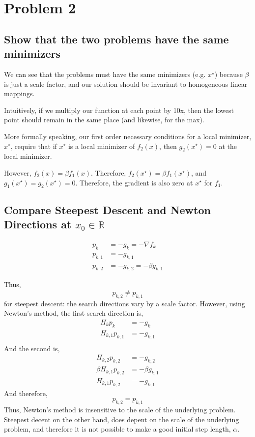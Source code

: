 \documentclass{article}
\begin{document}
\section{Problem 2}

\subsection{Show that the two problems have the same minimizers}

We can see that the problems must have the same minimizers
(e.g. $x^\star$) because $\beta$ is just a scale factor, and our solution
should be invariant to homogeneous linear mappings. 

Intuitively, if we multiply our function at each point by 10x, then 
the lowest point should remain in the same place (and likewise, for the
max). 

More formally speaking, our first order necessary conditions for a local
minimizer, $x^\star$, require that if $x^\star$ is a local minimizer of
$f_2(x)$, then $g_2(x^\star) = 0 $ at the local minimizer. 

However, $f_2(x) = \beta f_1(x)$. Therefore,  $f_2(x^\star) = \beta
f_1(x^\star)$, and $g_1(x^\star) = g_2(x^\star) = 0 $. Therefore, the
gradient is also zero at $x^\star$ for $f_1$.

\subsection{Compare Steepest Descent and Newton Directions at $x_0 \in \mathbb{R}$}

\begin{align*}
 p_k&=-g_k = -\nabla f_k\\
 p_{k,1}&=-g_{k,1}\\
 p_{k,2}&=-g_{k,2} = -\beta g_{k,1}
\end{align*}

Thus, 
\begin{equation}
p_{k,2} \ne p_{k,1}
\end{equation}
for steepest descent: the search directions
vary by a scale factor. However, using Newton's method, the first search
direction is,
\begin{align*}
 H_k p_k&=-g_k \\
 H_{k,1} p_{k,1}&=-g_{k,1}\\
\end{align*}
And the second is,
\begin{align*}
 H_{k,2} p_{k,2}&=-g_{k,2}\\
 \beta H_{k,1} p_{k,2}&=- \beta g_{k,1}\\
 H_{k,1} p_{k,2}&=-g_{k,1}
\end{align*}
And therefore, 
\begin{equation}
p_{k,2} = p_{k,1}
\end{equation}
Thus, Newton's method is insensitive to the scale of the underlying
problem. Steepest decent on the other hand, does depent on the scale of
the underlying problem, and therefore it is not possible to make a good
initial step length, $\alpha$.
\end{document}
